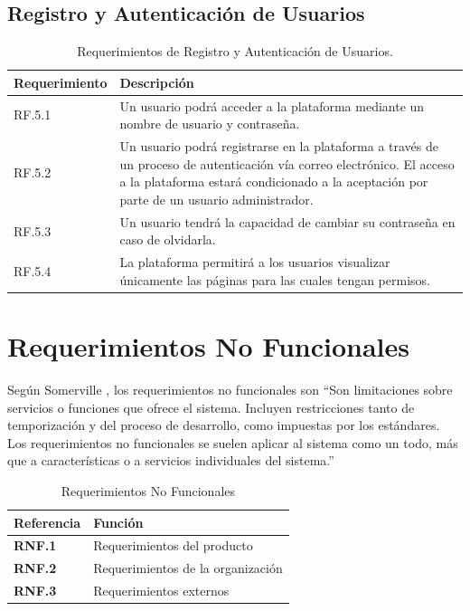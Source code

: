\subsection{Registro y Autenticación de Usuarios}

\begin{table}[H]
    \centering
    \begin{tabular}{|l|p{10cm}|}
        \hline
        \textbf{Requerimiento} & \textbf{Descripción} \\
        \hline
        RF.5.1 & Un usuario podrá acceder a la plataforma mediante un nombre de usuario y contraseña. \\
        \hline
        RF.5.2 & Un usuario podrá registrarse en la plataforma a través de un proceso de autenticación vía correo electrónico. El acceso a la plataforma estará condicionado a la aceptación por parte de un usuario administrador. \\
        \hline
        RF.5.3 & Un usuario tendrá la capacidad de cambiar su contraseña en caso de olvidarla. \\
        \hline
        RF.5.4 & La plataforma permitirá a los usuarios visualizar únicamente las páginas para las cuales tengan permisos. \\
        \hline
    \end{tabular}
    \caption{Requerimientos de Registro y Autenticación de Usuarios.}
    \label{tab:registro-autenticacion}
\end{table}

\section{Requerimientos No Funcionales}
Según Somerville \cite{Somerville}, los requerimientos no funcionales son ``Son limitaciones sobre servicios o funciones que
ofrece el sistema. Incluyen restricciones tanto de temporización y del proceso de
desarrollo, como impuestas por los estándares. Los requerimientos no funcionales
se suelen aplicar al sistema como un todo, más que a características o a servicios
individuales del sistema.''

\begin{table}[H]
\centering
\begin{tabular}{|l|l|}
\hline
\textbf{Referencia} & \textbf{Función} \\
\hline
\textbf{RNF.1} & Requerimientos del producto \\
\hline
\textbf{RNF.2} & Requerimientos de la organización \\
\hline
\textbf{RNF.3} & Requerimientos externos \\
\hline
\end{tabular}
\caption{Requerimientos No Funcionales}
\label{tab:rnf}
\end{table}

